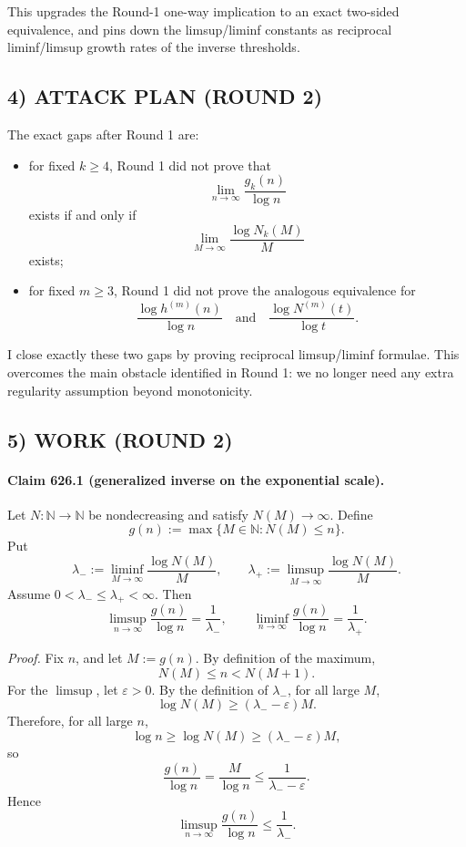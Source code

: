 This upgrades the Round-1 one-way implication to an exact two-sided equivalence, and pins down
the limsup/liminf constants as reciprocal liminf/limsup growth rates of the inverse thresholds.

\subsection*{4) ATTACK PLAN (ROUND 2)}

The exact gaps after Round 1 are:

\begin{itemize}
\item for fixed \(k\ge 4\), Round 1 did not prove that
\[
\lim_{n\to\infty}\frac{g_k(n)}{\log n}
\]
exists if and only if
\[
\lim_{M\to\infty}\frac{\log N_k(M)}{M}
\]
exists;
\item for fixed \(m\ge 3\), Round 1 did not prove the analogous equivalence for
\[
\frac{\log h^{(m)}(n)}{\log n}
\quad\text{and}\quad
\frac{\log N^{(m)}(t)}{\log t}.
\]
\end{itemize}

I close exactly these two gaps by proving reciprocal limsup/liminf formulae.
This overcomes the main obstacle identified in Round 1: we no longer need any extra
regularity assumption beyond monotonicity.

\subsection*{5) WORK (ROUND 2)}

\paragraph{Claim 626.1 (generalized inverse on the exponential scale).}
Let \(N:\mathbb{N}\to\mathbb{N}\) be nondecreasing and satisfy \(N(M)\to\infty\).
Define
\[
g(n):=\max\{M\in\mathbb{N}:N(M)\le n\}.
\]
Put
\[
\lambda_-:=\liminf_{M\to\infty}\frac{\log N(M)}{M},
\qquad
\lambda_+:=\limsup_{M\to\infty}\frac{\log N(M)}{M}.
\]
Assume \(0<\lambda_-\le \lambda_+<\infty\).
Then
\[
\limsup_{n\to\infty}\frac{g(n)}{\log n}=\frac{1}{\lambda_-},
\qquad
\liminf_{n\to\infty}\frac{g(n)}{\log n}=\frac{1}{\lambda_+}.
\]

\emph{Proof.}
Fix \(n\), and let \(M:=g(n)\). By definition of the maximum,
\[
N(M)\le n < N(M+1).
\]
For the \(\limsup\), let \(\varepsilon>0\). By the definition of \(\lambda_-\), for all large \(M\),
\[
\log N(M)\ge (\lambda_--\varepsilon)M.
\]
Therefore, for all large \(n\),
\[
\log n\ge \log N(M)\ge (\lambda_--\varepsilon)M,
\]
so
\[
\frac{g(n)}{\log n}=\frac{M}{\log n}\le \frac{1}{\lambda_--\varepsilon}.
\]
Hence
\[
\limsup_{n\to\infty}\frac{g(n)}{\log n}\le \frac{1}{\lambda_-}.
\]

